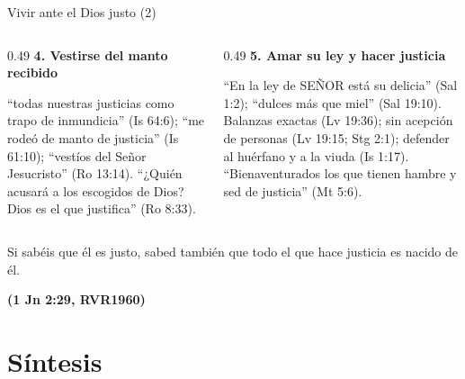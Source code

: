 \documentclass[hyperref={bookmarks=false},aspectratio=169]{beamer}
\newcommand{\SENOR}{S{\fontsize{0.78em}{1em}\selectfont EÑOR}}
\newcommand{\fuente}[1]{\par\hfill{\upshape\bfseries\footnotesize\textcolor{azul}{#1}}}
\begin{document}
\begin{frame}{Vivir ante el Dios justo (2)}
\begin{columns}[t,onlytextwidth]
\begin{column}{0.49\textwidth}
\textbf{\color{azul}4. Vestirse del manto recibido}\par\small
``todas nuestras justicias como trapo de inmundicia'' (Is 64:6); ``me rodeó de manto de justicia'' (Is 61:10); ``vestíos del Señor Jesucristo'' (Ro 13:14). ``¿Quién acusará a los escogidos de Dios? Dios es el que justifica'' (Ro 8:33).
\end{column}
\begin{column}{0.49\textwidth}
\textbf{\color{azul}5. Amar su ley y hacer justicia}\par\small
``En la ley de \SENOR{} está su delicia'' (Sal 1:2); ``dulces más que miel'' (Sal 19:10).
Balanzas exactas (Lv 19:36); sin acepción de personas (Lv 19:15; Stg 2:1); defender al huérfano y a la viuda (Is 1:17). ``Bienaventurados los que tienen hambre y sed de justicia'' (Mt 5:6).
\end{column}
\end{columns}\par\bigskip
\begin{cita}Si sabéis que él es justo, sabed también que todo el que hace justicia es nacido de él.\fuente{(1 Jn 2:29, RVR1960)}\end{cita}
\end{frame}

\section{Síntesis}
\end{document}
